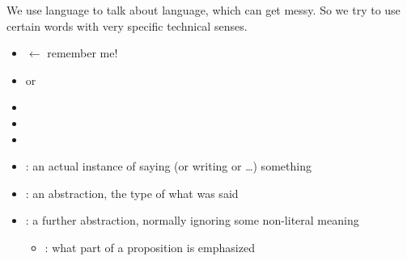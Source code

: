 \documentclass[headrule,footrule]{foils}
\begin{document}

We use language to talk about language, which can get messy.  So we
try to use certain words with very specific technical senses.

\begin{itemize}
\item {} $\leftarrow$ remember me!
\item {} or 
\item {}
\item {}
\item {}
\end{itemize}

\begin{itemize}
\item {}: an actual instance of saying (or writing  or \ldots) something
\item {}: an abstraction, the type of what was said
  \begin{exe}
    \ex {}
  \end{exe}
\item {}: a further abstraction, normally ignoring some non-literal meaning
  \begin{exe}
    \ex {}
  \end{exe}
  \begin{itemize}
  \item {}: what part of a proposition is emphasized
 \begin{exe}
   \ex {}
   \ex {}
   \ex {}
   \ex {}
  \end{exe}
  \end{itemize}

\end{itemize}
\end{document}
